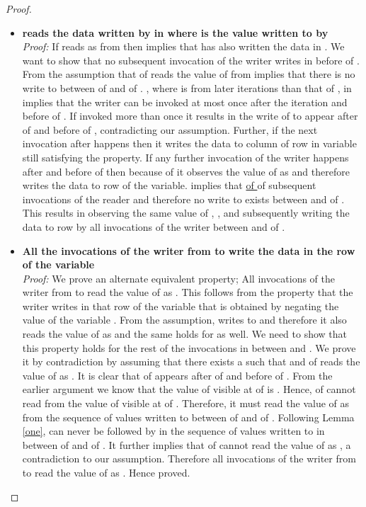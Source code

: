 \begin{description}
\begin{proof}
\begin{itemize}
 \item \textbf{ reads the data written by  in  where  is the value written to  by } \\
\emph{Proof:} If  reads  as  from  then \ul{} implies that  has also written the data in . We want to show that 
no subsequent invocation of the writer writes in  before  of . From the assumption that  of  reads the value of  from  implies that there is no write to  between  of  and  of . \ul{}, where  is from later iterations than 
that of , in  implies that the writer can be invoked at most once after the iteration  and before  of . If invoked more than once it results in the write of  to appear after  of  and before  of , contradicting our assumption. Further, if the next invocation after  happens then it writes the data to column  of row  in  variable still satisfying the property. If any further invocation of the writer happens after  and before  of  then because of \ul{} it observes the 
value of  as  and therefore writes the data to  row of the  variable.  implies that \ul{ of } of subsequent invocations of the reader and therefore no write to  exists between  and  of . This results in observing the same value of , , and subsequently writing the data to row  by all invocations of the writer between  and  of .

\item \textbf{All the invocations of the writer from  to  write the data in the row  of the  variable}\\
\emph{Proof:} We prove an alternate equivalent property; All invocations of the writer from  to  read the value of  as . This follows from the property that the 
writer writes in that row of the  variable that is obtained by negating the value of the variable . From the assumption,  writes to  and therefore it also reads the value of  as  and the same holds for  as well. We need to show that this property holds for the rest of the invocations in between  and . We prove it by contradiction by assuming that there exists a  such that  and  of  reads the value of  as . It is clear that  of  appears after  of  and before  of . From the earlier argument we know that the value of  visible at  of  is . Hence,  of  cannot read from the value of  visible at  of . Therefore, it must read the value of  as  from the sequence of values written to  between  of  and  of . 
Following Lemma \ref{one},  can never be followed by  in the sequence of values written to  in between  of  and  of . 
It further implies that  of  cannot read the value of  as , a contradiction to our assumption. Therefore all invocations of the writer from  to  read the value of  as . Hence proved.
\end{itemize}


\end{proof}
\end{description}
